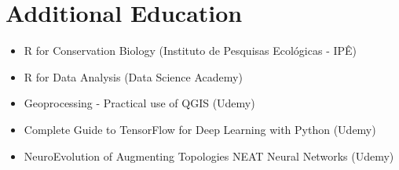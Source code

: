 \documentclass[a4paper,10pt]{article}
\begin{document}
\section*{Additional Education}
\begin{itemize}[left=0pt]
	\item R for Conservation Biology (Instituto de Pesquisas Ecológicas - IPÊ)
	\item R for Data Analysis (Data Science Academy)
	\item Geoprocessing - Practical use of QGIS (Udemy)
	\item Complete Guide to TensorFlow for Deep Learning with Python (Udemy)
	\item NeuroEvolution of Augmenting Topologies NEAT Neural Networks (Udemy)
\end{itemize}
\end{document}
